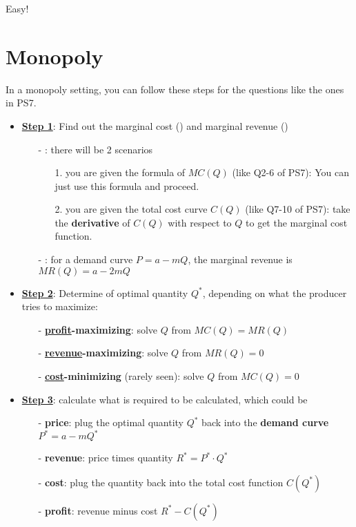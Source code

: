 \documentclass[twoside]{article}
\theoremstyle{definition}
\begin{document}
Easy!

\section{Monopoly}
In a monopoly setting, you can follow these steps for the questions like the ones in PS7.

\begin{itemize}
    \item \textbf{\underline{Step 1}}: Find out the marginal cost () and marginal revenue ()
    \begin{itemize}
        \item[-] : there will be 2 scenarios
        \begin{itemize}
            \item[1.] you are given the formula of $MC(Q)$ (like Q2-6 of PS7): You can just use this formula and proceed.
            \item[2.] you are given the total cost curve $C(Q)$ (like Q7-10 of PS7):  take the \textbf{derivative} of $C(Q)$ with respect to $Q$ to get the marginal cost function.
        \end{itemize}
        \item[-] : for a demand curve $P=a-mQ$, the marginal revenue is $MR(Q)=a-2mQ$
    \end{itemize}
    \item \textbf{\underline{Step 2}}: Determine of optimal quantity $Q^*$, depending on what the producer tries to maximize: 
    \begin{itemize}
        \item[-] \textbf{\underline{profit}-maximizing}: solve $Q$ from $MC(Q)=MR(Q)$
        \item[-] \textbf{\underline{revenue}-maximizing}: solve $Q$ from $MR(Q)=0$
        \item[-] \textbf{\underline{cost}-minimizing} (rarely seen): solve $Q$ from $MC(Q)=0$
    \end{itemize}
    
    \item \textbf{\underline{Step 3}}: calculate what is required to be calculated, which could be
    \begin{itemize}
        \item[-] \textbf{price}: plug the optimal quantity $Q^*$ back into the \textbf{demand curve} $P^*=a-mQ^*$ 
        \item[-] \textbf{revenue}: price times quantity $R^* = P^*\cdot Q^*$
        \item[-] \textbf{cost}: plug the quantity back into the total cost function $C(Q^*)$
        \item[-] \textbf{profit}: revenue minus cost $R^*-C(Q^*)$
    \end{itemize}
\end{itemize}
\end{document}
